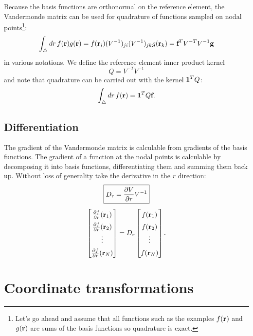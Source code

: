 Because the basis functions are orthonormal on the reference element, the Vandermonde matrix can be used for quadrature of functions sampled on nodal points\footnote{Let's go ahead and assume that all functions such as the examples $f(\textbf{r})$ and $g(\textbf{r})$ are sums of the basis functions so quadrature is exact.}:
%
\begin{equation}
\int_\bigtriangleup dr \, f(\textbf{r}) g(\textbf{r}) = f(\textbf{r}_i) (V^{-1})_{ji}(V^{-1})_{jk} g(\textbf{r}_k) = \textbf{f}^T V^{-T} V^{-1} \textbf{g}
\end{equation}
%
in various notations.  We define the reference element inner product kernel
%
\begin{equation}
\boxed{
Q = V^{-T} V^{-1}
}
\end{equation}
%
and note that quadrature can be carried out with the kernel $\textbf{1}^T Q$:
%
\begin{equation}
\int_\bigtriangleup dr \, f(\textbf{r}) = \textbf{1}^T Q \textbf{f}.
\end{equation}

\subsection{Differentiation}

The gradient of the Vandermonde matrix is calculable from gradients of the basis functions.  The gradient of a function at the nodal points is calculable by decomposing it into basis functions, differentiating them and summing them back up.  Without loss of generality take the derivative in the $r$ direction:
%
\begin{equation}
\boxed{
D_r = \frac{\partial{V}}{\partial{r}} V^{-1}
}
\end{equation}
%
\begin{equation}
\renewcommand\arraystretch{1.5}
\begin{bmatrix}
\pp{f}{r}(\ve r_1) \\ \pp{f}{r}(\ve r_2) \\ \vdots \\ \pp{f}{r}(\ve r_N)
\end{bmatrix}
=
D_r \begin{bmatrix} f(\ve r_1) \\ f(\ve r_2) \\ \vdots \\ f(\ve r_N) \end{bmatrix}.
\end{equation}

\section{Coordinate transformations}

